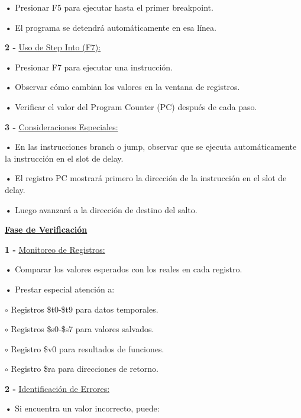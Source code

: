 \documentclass{article}
\begin{document}
\quad

\textbf{•   } { Presionar F5 para ejecutar hasta el primer breakpoint.}

\textbf{•   } { El programa se detendrá automáticamente en esa línea.}

\quad

\textbf{2 -  } {\underline{ Uso de Step Into (F7):}}

\quad

\textbf{•   } { Presionar F7 para ejecutar una instrucción.}

\textbf{•   } { Observar cómo cambian los valores en la ventana de registros.}

\textbf{•   } { Verificar el valor del Program Counter (PC) después de cada paso.}


\quad

\textbf{3 -  } {\underline{ Consideraciones Especiales:}}

\quad

\textbf{•   } { En las instrucciones branch o jump, observar que se ejecuta automáticamente la instrucción en el slot de delay.}

\textbf{•   } {El registro PC mostrará primero la dirección de la instrucción en el slot de delay.}

\textbf{•   } { Luego avanzará a la dirección de destino del salto.}


\quad

\textbf{\underline{Fase de Verificación}}

\quad

\textbf{1 -  } {\underline{ Monitoreo de Registros:}}

\quad

\textbf{•   } { Comparar los valores esperados con los reales en cada registro.}

\textbf{•   } { Prestar especial atención a: }

\quad

$\circ$ {Registros \$t0-\$t9 para datos temporales.}

$\circ$ {Registros \$s0-\$s7 para valores salvados.}

$\circ$ {Registro \$v0 para resultados de funciones.}

$\circ$ {Registro \$ra para direcciones de retorno.}

\quad

\textbf{2 -  } {\underline{ Identificación de Errores:}}

\quad

\textbf{•   } { Si encuentra un valor incorrecto, puede:}
\end{document}

